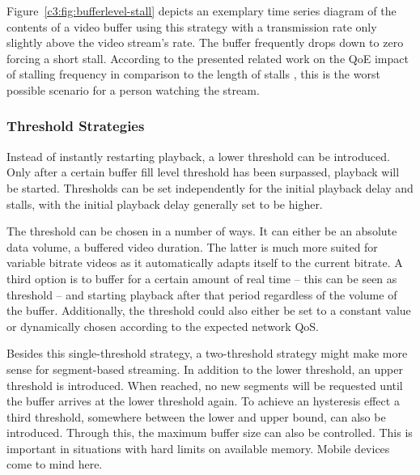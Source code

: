 Figure~\ref{c3:fig:bufferlevel-stall} depicts an exemplary time series diagram of the contents of a video buffer using this strategy with a transmission rate only slightly above the video stream's rate. The buffer frequently drops down to zero forcing a short stall. According to the presented related work on the \gls{QoE} impact of stalling frequency in comparison to the length of stalls \cite{6123395}, this is the worst possible scenario for a person watching the stream.


\subsubsection{Threshold Strategies}

Instead of instantly restarting playback, a lower threshold can be introduced. Only after a certain buffer fill level threshold has been surpassed, playback will be started. Thresholds can be set independently for the initial playback delay and stalls, with the initial playback delay generally set to be higher.

The threshold can be chosen in a number of ways. It can either be an absolute data volume, a buffered video duration. The latter is much more suited for variable bitrate videos as it automatically adapts itself to the current bitrate. A third option is to buffer for a certain amount of real time -- this can be seen as threshold -- and starting playback after that period regardless of the volume of the buffer. Additionally, the threshold could also either be set to a constant value or dynamically chosen according to the expected network \gls{QoS}.

Besides this single-threshold strategy, a two-threshold strategy might make more sense for segment-based streaming. In addition to the lower threshold, an upper threshold is introduced. When reached, no new segments will be requested until the buffer arrives at the lower threshold again.  To achieve an hysteresis effect a third threshold, somewhere between the lower and upper bound, can also be introduced. Through this, the maximum buffer size can also be controlled. This is important in situations with hard limits on available memory. Mobile devices come to mind here.

